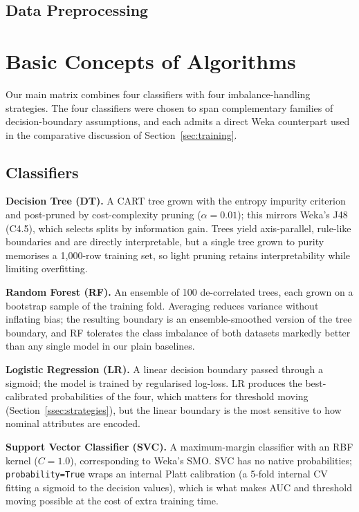 \documentclass[a4paper,12pt]{article}
\begin{document}
\subsection{Data Preprocessing}



\section{Basic Concepts of Algorithms}
\label{sec:algorithms}

Our main matrix combines four classifiers with four imbalance-handling
strategies. The four classifiers were chosen to span complementary
families of decision-boundary assumptions, and each admits a direct
Weka counterpart used in the comparative discussion of
Section~\ref{sec:training}.

\subsection{Classifiers}
\textbf{Decision Tree (DT).} A CART tree grown with the entropy
impurity criterion and post-pruned by cost-complexity pruning
($\alpha=0.01$); this mirrors Weka's J48 (C4.5), which selects splits
by information gain. Trees yield axis-parallel, rule-like boundaries
and are directly interpretable, but a single tree grown to purity
memorises a 1{,}000-row training set, so light pruning retains
interpretability while limiting overfitting.

\textbf{Random Forest (RF).} An ensemble of 100 de-correlated trees,
each grown on a bootstrap sample of the training fold. Averaging
reduces variance without inflating bias; the resulting boundary is an
ensemble-smoothed version of the tree boundary, and RF tolerates the
class imbalance of both datasets markedly better than any single model
in our plain baselines.

\textbf{Logistic Regression (LR).} A linear decision boundary passed
through a sigmoid; the model is trained by regularised log-loss. LR
produces the best-calibrated probabilities of the four, which matters
for threshold moving (Section~\ref{ssec:strategies}), but the linear
boundary is the most sensitive to how nominal attributes are encoded.

\textbf{Support Vector Classifier (SVC).} A maximum-margin classifier
with an RBF kernel ($C=1.0$), corresponding to Weka's SMO. SVC has no
native probabilities; \texttt{probability=True} wraps an internal
Platt calibration (a 5-fold internal CV fitting a sigmoid to the
decision values), which is what makes AUC and threshold moving
possible at the cost of extra training time.
\end{document}
